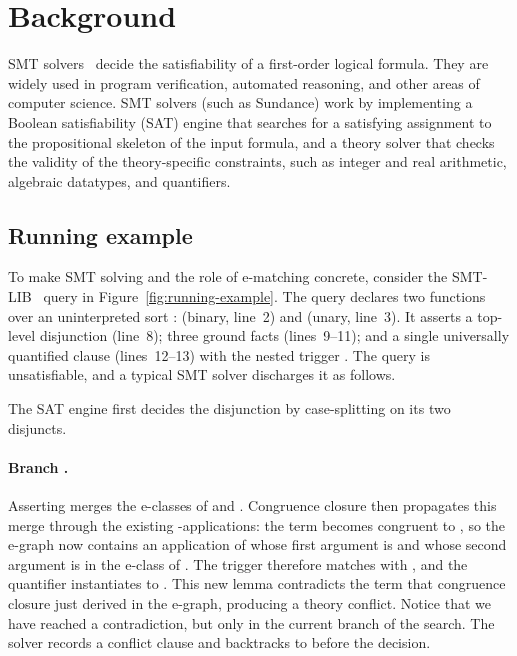 \section{Background}
\label{sec:background}

SMT solvers~\cite{smtchapter} decide the satisfiability of a first-order logical
formula. They are widely used in program verification, automated reasoning, and
other areas of computer science. SMT solvers (such as Sundance) work by
implementing a Boolean satisfiability (SAT) engine that searches for a
satisfying assignment to the propositional skeleton of the input formula, and a
theory solver that checks the validity of the theory-specific constraints, such
as integer and real arithmetic, algebraic datatypes, and quantifiers. 


\subsection{Running example}

To make SMT solving and the role of e-matching concrete, consider the
SMT-LIB~\cite{smtlibstandard} query in Figure~\ref{fig:running-example}. The
query declares two functions over an uninterpreted sort : 
(binary, line~2) and  (unary, line~3). It asserts a top-level disjunction
(line~8); three ground facts (lines~9--11); and a single universally quantified
clause (lines~12--13) with the nested trigger . The query is
unsatisfiable, and a typical SMT solver discharges it as follows.

The SAT engine first decides the disjunction by case-splitting on its two
disjuncts.

\paragraph{Branch .} Asserting  merges the e-classes of
 and . Congruence closure then propagates this merge through the
existing -applications: the term  becomes congruent to
, so the e-graph now contains an application of  whose
first argument is  and whose second argument is in the e-class of
. The trigger  therefore matches with , and
the quantifier instantiates to . This new lemma
contradicts the term  that congruence closure just derived in
the e-graph, producing a theory conflict.  Notice that we have reached a 
contradiction, but only in the current branch of the search.
The solver records a conflict clause
and backtracks to before the  decision.

